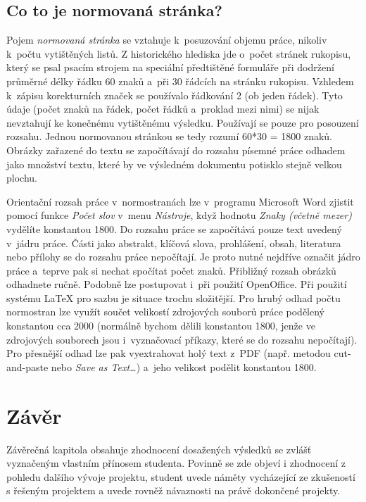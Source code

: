 \section{Co to je normovaná stránka?}
Pojem {\it normovaná stránka} se vztahuje k~posuzování objemu práce, nikoliv k~počtu vytištěných listů. Z historického hlediska jde o~počet stránek rukopisu, který se psal psacím strojem na speciální předtištěné formuláře při dodržení průměrné délky řádku 60 znaků a~při 30 řádcích na stránku rukopisu. Vzhledem k~zápisu korekturních značek se používalo řádkování 2 (ob jeden řádek). Tyto údaje (počet znaků na řádek, počet řádků a~proklad mezi nimi) se nijak nevztahují ke konečnému vytištěnému výsledku. Používají se pouze pro posouzení rozsahu. Jednou normovanou stránkou se tedy rozumí 60*30 = 1800 znaků. Obrázky zařazené do textu se započítávají do rozsahu písemné práce odhadem jako množství textu, které by ve výsledném dokumentu potisklo stejně velkou plochu.

Orientační rozsah práce v~normostranách lze v~programu Microsoft Word zjistit pomocí funkce {\it Počet slov} v~menu {\it Nástroje}, když hodnotu {\it Znaky (včetně mezer)} vydělíte konstantou 1800. Do rozsahu práce se započítává pouze text uvedený v~jádru práce. Části jako abstrakt, klíčová slova, prohlášení, obsah, literatura nebo přílohy se do rozsahu práce nepočítají. Je proto nutné nejdříve označit jádro práce a~teprve pak si nechat spočítat počet znaků. Přibližný rozsah obrázků odhadnete ručně. Podobně lze postupovat i~při použití OpenOffice. Při použití systému LaTeX pro sazbu je situace trochu složitější. Pro hrubý odhad počtu normostran lze využít součet velikostí zdrojových souborů práce podělený konstantou cca 2000 (normálně bychom dělili konstantou 1800, jenže ve zdrojových souborech jsou i~vyznačovací příkazy, které se do rozsahu nepočítají). Pro přesnější odhad lze pak vyextrahovat holý text z~PDF (např. metodou cut-and-paste nebo {\it Save as Text\ldots}) a~jeho velikost podělit konstantou 1800. 


\chapter{Závěr}
Závěrečná kapitola obsahuje zhodnocení dosažených výsledků se zvlášť vyznačeným vlastním přínosem studenta. Povinně se zde objeví i zhodnocení z pohledu dalšího vývoje projektu, student uvede náměty vycházející ze zkušeností s řešeným projektem a uvede rovněž návaznosti na právě dokončené projekty.


